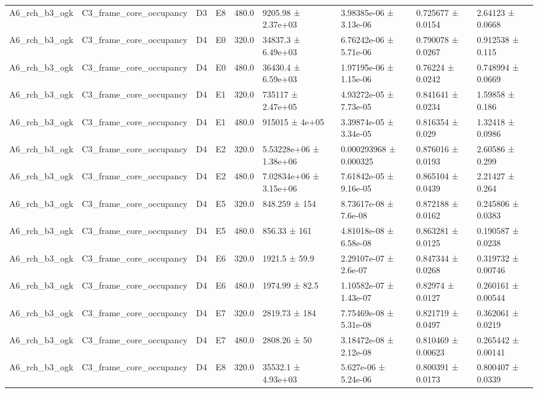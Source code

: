 \begin{table}
\begin{tabular}{lllllllll}
A6\_rch\_b3\_ogk & C3\_frame\_core\_occupancy & D3 & E8 & 480.0 & 9205.98 ± 2.37e+03 & 3.98385e-06 ± 3.13e-06 & 0.725677 ± 0.0154 & 2.64123 ± 0.0668 \\
A6\_rch\_b3\_ogk & C3\_frame\_core\_occupancy & D4 & E0 & 320.0 & 34837.3 ± 6.49e+03 & 6.76242e-06 ± 5.71e-06 & 0.790078 ± 0.0267 & 0.912538 ± 0.115 \\
A6\_rch\_b3\_ogk & C3\_frame\_core\_occupancy & D4 & E0 & 480.0 & 36430.4 ± 6.59e+03 & 1.97195e-06 ± 1.15e-06 & 0.76224 ± 0.0242 & 0.748994 ± 0.0669 \\
A6\_rch\_b3\_ogk & C3\_frame\_core\_occupancy & D4 & E1 & 320.0 & 735117 ± 2.47e+05 & 4.93272e-05 ± 7.73e-05 & 0.841641 ± 0.0234 & 1.59858 ± 0.186 \\
A6\_rch\_b3\_ogk & C3\_frame\_core\_occupancy & D4 & E1 & 480.0 & 915015 ± 4e+05 & 3.39874e-05 ± 3.34e-05 & 0.816354 ± 0.029 & 1.32418 ± 0.0986 \\
A6\_rch\_b3\_ogk & C3\_frame\_core\_occupancy & D4 & E2 & 320.0 & 5.53228e+06 ± 1.38e+06 & 0.000293968 ± 0.000325 & 0.876016 ± 0.0193 & 2.60586 ± 0.299 \\
A6\_rch\_b3\_ogk & C3\_frame\_core\_occupancy & D4 & E2 & 480.0 & 7.02834e+06 ± 3.15e+06 & 7.61842e-05 ± 9.16e-05 & 0.865104 ± 0.0439 & 2.21427 ± 0.264 \\
A6\_rch\_b3\_ogk & C3\_frame\_core\_occupancy & D4 & E5 & 320.0 & 848.259 ± 154 & 8.73617e-08 ± 7.6e-08 & 0.872188 ± 0.0162 & 0.245806 ± 0.0383 \\
A6\_rch\_b3\_ogk & C3\_frame\_core\_occupancy & D4 & E5 & 480.0 & 856.33 ± 161 & 4.81018e-08 ± 6.58e-08 & 0.863281 ± 0.0125 & 0.190587 ± 0.0238 \\
A6\_rch\_b3\_ogk & C3\_frame\_core\_occupancy & D4 & E6 & 320.0 & 1921.5 ± 59.9 & 2.29107e-07 ± 2.6e-07 & 0.847344 ± 0.0268 & 0.319732 ± 0.00746 \\
A6\_rch\_b3\_ogk & C3\_frame\_core\_occupancy & D4 & E6 & 480.0 & 1974.99 ± 82.5 & 1.10582e-07 ± 1.43e-07 & 0.82974 ± 0.0127 & 0.260161 ± 0.00544 \\
A6\_rch\_b3\_ogk & C3\_frame\_core\_occupancy & D4 & E7 & 320.0 & 2819.73 ± 184 & 7.75469e-08 ± 5.31e-08 & 0.821719 ± 0.0497 & 0.362061 ± 0.0219 \\
A6\_rch\_b3\_ogk & C3\_frame\_core\_occupancy & D4 & E7 & 480.0 & 2808.26 ± 50 & 3.18472e-08 ± 2.12e-08 & 0.810469 ± 0.00623 & 0.265442 ± 0.00141 \\
A6\_rch\_b3\_ogk & C3\_frame\_core\_occupancy & D4 & E8 & 320.0 & 35532.1 ± 4.93e+03 & 5.627e-06 ± 5.24e-06 & 0.800391 ± 0.0173 & 0.800407 ± 0.0339 \\

\end{tabular}
\end{table}
